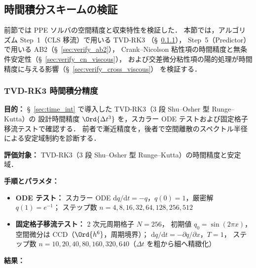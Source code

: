 %

\subsection{時間積分スキームの検証}
\label{sec:verify_time}

前節では PPE ソルバの空間精度と収束特性を検証した．
本節では，アルゴリズム Step~1（CLS 移流）で用いる TVD-RK3
（§~\ref{sec:verify_tvd_rk3}），
Step~5（Predictor）で用いる AB2（§~\ref{sec:verify_ab2}），
Crank--Nicolson 粘性項の時間精度と無条件安定性（§~\ref{sec:verify_cn_viscous}），
および交差微分粘性項の陽的処理が時間精度に与える影響（§~\ref{sec:verify_cross_viscous}）
を検証する．


\subsubsection{TVD-RK3 時間積分精度}
\label{sec:verify_tvd_rk3}

\noindent\textbf{目的：}
§~\ref{sec:time_int} で導入した TVD-RK3（3 段 Shu--Osher 型 Runge--Kutta）の
設計時間精度 $\Ord{\Delta t^3}$ を，スカラー ODE テストおよび固定格子移流テストで確認する．
前者で漸近精度を，後者で空間離散のスペクトル半径による安定域制約を診断する．

\noindent\textbf{評価対象：}
TVD-RK3（3 段 Shu--Osher 型 Runge--Kutta）の時間精度と安定域．

\noindent\textbf{手順とパラメタ：}
\begin{itemize}[noitemsep]
  \item \textbf{ODE テスト：} スカラー ODE $\mathrm{d}q/\mathrm{d}t = -q$，$q(0)=1$，厳密解 $q(1) = e^{-1}$；
        ステップ数 $n = 4, 8, 16, 32, 64, 128, 256, 512$
  \item \textbf{固定格子移流テスト：} 2 次元周期格子 $N = 256$，
        初期値 $q_0 = \sin(2\pi x)$，空間微分は CCD（$\Ord{h^6}$，周期境界）；
        $\mathrm{d}q/\mathrm{d}t = -\partial q/\partial x$，$T = 1$，
        ステップ数 $n = 10, 20, 40, 80, 160, 320, 640$（$\Delta t$ を粗から細へ精緻化）
\end{itemize}

\noindent\textbf{結果：}

